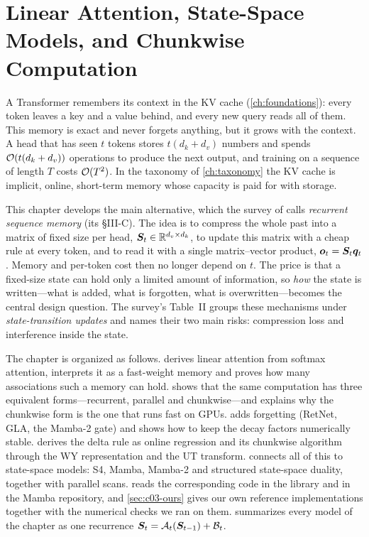 \chapter{Linear Attention, State-Space Models, and Chunkwise Computation}\label{ch:linear}
\raggedbottom

A Transformer remembers its context in the KV cache (\cref{ch:foundations}): every token leaves
a key and a value behind, and every new query reads all of them. This memory is exact and never
forgets anything, but it grows with the context. A head that has seen $t$ tokens stores
$t(d_k+d_v)$ numbers and spends $\mathcal{O}(t(d_k+d_v))$ operations to produce the next output, and
training on a sequence of length $T$ costs $\mathcal{O}(T^2)$. In the taxonomy of \cref{ch:taxonomy}
the KV cache is implicit, online, short-term memory whose capacity is paid for with storage.

This chapter develops the main alternative, which the survey of \citet{zhoubian2026memory} calls
\emph{recurrent sequence memory} (its \S III-C). The idea is to compress the whole past into a
matrix of fixed size per head, $\bm{S}_t\in\mathbb{R}^{d_v\times d_k}$, to update this matrix with a cheap
rule at every token, and to read it with a single matrix--vector product, $\bm{o}_t=\bm{S}_t\bm{q}_t$.
Memory and per-token cost then no longer depend on $t$. The price is that a fixed-size state can
hold only a limited amount of information, so \emph{how} the state is written---what is added,
what is forgotten, what is overwritten---becomes the central design question. The survey's
Table~II groups these mechanisms under \emph{state-transition updates} and names their two main
risks: compression loss and interference inside the state.

The chapter is organized as follows.  derives linear attention from
softmax attention, interprets it as a fast-weight memory and proves how many associations such a
memory can hold.  shows that the same computation has three equivalent
forms---recurrent, parallel and chunkwise---and explains why the chunkwise form is the one that
runs fast on GPUs.  adds forgetting (RetNet, GLA, the Mamba-2 gate) and
shows how to keep the decay factors numerically stable.  derives the delta
rule as online regression and its chunkwise algorithm through the WY representation and the UT
transform.  connects all of this to state-space models: S4, Mamba, Mamba-2 and
structured state-space duality, together with parallel scans.  reads the
corresponding code in the \fla{} library and in the Mamba repository, and \cref{sec:c03-ours}
gives our own reference implementations together with the numerical checks we ran on them.
 summarizes every model of the chapter as one recurrence
$\bm{S}_t=\mathcal{A}_t(\bm{S}_{t-1})+\mathcal{B}_t$.

